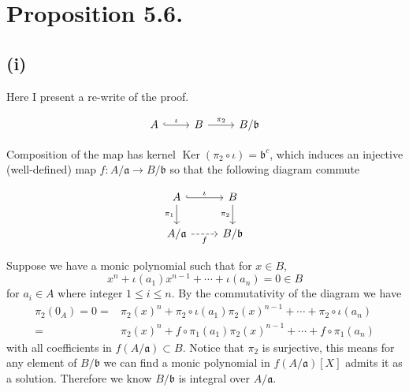 \section{Proposition 5.6.}

\subsection{(i)}
Here I present a re-write of the proof. 

\[\begin{tikzcd}
	A & B & {B/\mathfrak b}
	\arrow["{\pi_2}", from=1-2, to=1-3]
	\arrow["\iota", hook, from=1-1, to=1-2]
\end{tikzcd}\]

Composition of the map has kernel $\operatorname{Ker}(\pi_2\circ\iota)= \mathfrak b^c$, which induces an injective (well-defined) map $f:A/\mathfrak a\to B/\mathfrak b$ so that the following diagram commute

\[\begin{tikzcd}
	A & B \\
	{A/\mathfrak a} & {B/\mathfrak b}
	\arrow["{\pi_1}"', from=1-1, to=2-1]
	\arrow["{\pi_2}"', from=1-2, to=2-2]
	\arrow["\iota", hook, from=1-1, to=1-2]
	\arrow["f"', dashed, from=2-1, to=2-2]
\end{tikzcd}\]

Suppose we have a monic polynomial such that for $x\in B$,
\[x^n+\iota(a_1)x^{n-1}+\cdots+\iota(a_n)=0\in B\] for $a_i\in A$ where integer $1\leq i\leq n$. By the commutativity of the diagram we have 
\begin{align*}
    \pi_2(0_A)=0=&\pi_2(x)^n+\pi_2\circ\iota(a_1)\pi_2(x)^{n-1}+\cdots+\pi_2\circ\iota(a_n)\\
    =&\pi_2(x)^n+f\circ\pi_1(a_1)\pi_2(x)^{n-1}+\cdots+f\circ\pi_1(a_n)
\end{align*}with all coefficients in $f(A/\mathfrak a)\subset B$. Notice that $\pi_2$ is surjective, this means for any element of $B/\mathfrak b$ we can find a monic polynomial in $f(A/\mathfrak a)[X]$ admits it as a solution. Therefore we know $B/\mathfrak b$ is integral over $A/\mathfrak a$.

